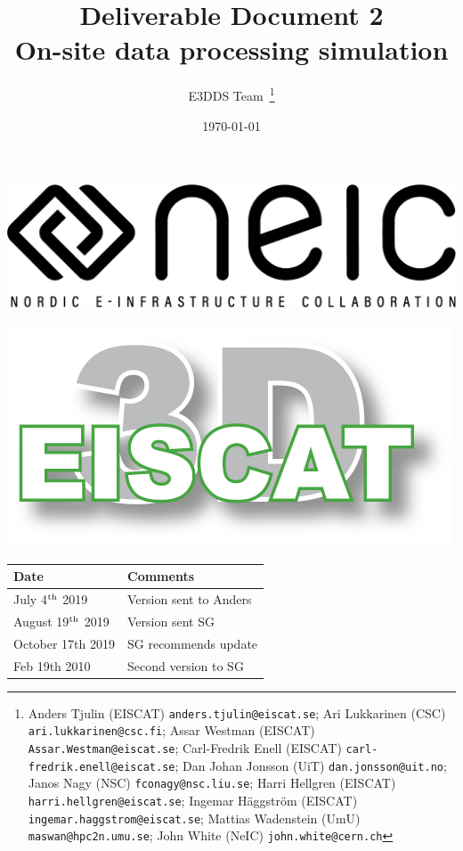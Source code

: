 \documentclass[12pt,a4paper]{article}
\title{
{\bf Deliverable Document 2} \\
On-site data processing simulation}
\author{E3DDS Team~\footnote{
Anders Tjulin (EISCAT) {\tt anders.tjulin@eiscat.se};
Ari Lukkarinen (CSC) {\tt ari.lukkarinen@csc.fi};
Assar Westman (EISCAT) {\tt Assar.Westman@eiscat.se};
Carl-Fredrik Enell (EISCAT) {\tt carl-fredrik.enell@eiscat.se};
Dan Johan Jonsson (UiT) {\tt dan.jonsson@uit.no};
Janos Nagy (NSC) {\tt fconagy@nsc.liu.se};
Harri Hellgren (EISCAT) {\tt harri.hellgren@eiscat.se};
Ingemar H\"{a}ggstr\"{o}m (EISCAT) {\tt ingemar.haggstrom@eiscat.se};
Mattias Wadenstein (UmU) {\tt maswan@hpc2n.umu.se};
John White (NeIC) {\tt john.white@cern.ch}}}
\date{\today}
\begin{document}
\pagestyle{fancy}

\maketitle
\par\noindent
\begin{minipage}{0.5\textwidth}
  \includegraphics[scale=0.18]{NEIC_logo_screen_black.pdf}
\end{minipage}
\begin{minipage}{0.5\textwidth}
  \hfill
  \includegraphics[width=0.75\linewidth]{e3d-logo-green-500px}
\end{minipage}

\begin{center}
\begin{tabular}{|l|l|} \hline
\large \bf Date & \large \bf Comments \\ \hline
\large July 4$^{\rm th}$ 2019 & Version sent to Anders \\ \hline
\large August 19$^{\rm th}$ 2019 & Version sent SG \\
\hline
\large October 17th 2019 & SG recommends update\\
\hline
\large Feb 19th 2010 & Second version to SG \\
\hline
\end{tabular}
\end{center}
\end{document}

